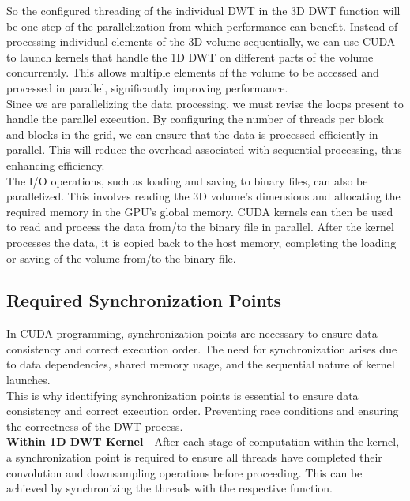 \documentclass{article}
\begin{document}
So the configured threading of the individual DWT in the 3D DWT function will be one step of the parallelization from which performance can benefit. Instead of processing individual elements of the 3D volume sequentially, we can use CUDA to launch kernels that handle the 1D DWT on different parts of the volume concurrently. This allows multiple elements of the volume to be accessed and processed in parallel, significantly improving performance.\\

Since we are parallelizing the data processing, we must revise the loops present to handle the parallel execution. By configuring the number of threads per block and blocks in the grid, we can ensure that the data is processed efficiently in parallel. This will reduce the overhead associated with sequential processing, thus enhancing efficiency.\\

The I/O operations, such as loading and saving to binary files, can also be parallelized. This involves reading the 3D volume's dimensions and allocating the required memory in the GPU's global memory. CUDA kernels can then be used to read and process the data from/to the binary file in parallel. After the kernel processes the data, it is copied back to the host memory, completing the loading or saving of the volume from/to the binary file.\\

\subsection{Required Synchronization Points}
In CUDA programming, synchronization points are necessary to ensure data consistency and correct execution order. The need for synchronization arises due to data dependencies, shared memory usage, and the sequential nature of kernel launches.\\

This is why identifying synchronization points is essential to ensure data consistency and correct execution order. Preventing race conditions and ensuring the correctness of the DWT process.\\

\textbf{Within 1D DWT Kernel} - After each stage of computation within the kernel, a synchronization point is required to ensure all threads have completed their convolution and downsampling operations before proceeding. This can be achieved by synchronizing the threads with the respective function.\\
\end{document}

